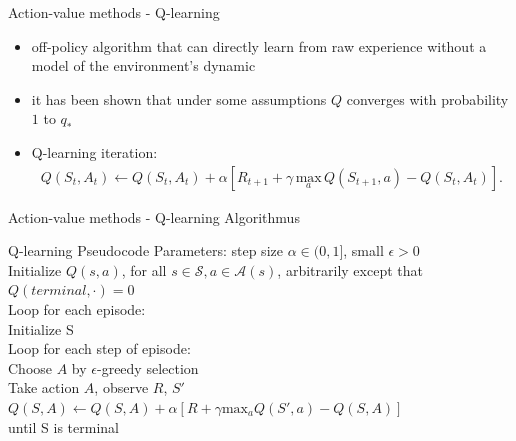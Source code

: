 \documentclass{beamer}
\begin{document}
\begin{frame}{Action-value methods - Q-learning}
\begin{itemize}
\item {off-policy algorithm that can directly learn from raw experience without a model of the environment's dynamic}
\pause
\item {it has been shown that under some assumptions $Q$ converges with probability $1$ to $q_*$}
\pause
\item {Q-learning iteration:
\begin{align*}
Q(S_t,A_t) \leftarrow Q(S_t, A_t) + \alpha [R_{t+1} + \gamma \, \underset{a}{\mathrm{max}} \, Q(S_{t+1},a) - Q(S_t,A_t)].
\end{align*}}
\end{itemize}
\end{frame}
\begin{frame}{Action-value methods - Q-learning Algorithmus}
\begin{exampleblock}{Q-learning Pseudocode}
Parameters: step size $\alpha \in (0,1]$, small $\epsilon > 0$\\
Initialize $Q(s,a)$, for all $s \in \mathcal{S}, a \in \mathcal{A}(s)$, arbitrarily except that $Q(terminal,\cdot) = 0$\\
\vspace*{0.3cm}
Loop for each episode:\\
\hspace*{0.5cm} Initialize S\\
\hspace*{0.5cm} Loop for each step of episode:\\
\hspace*{0.5cm} \hspace*{0.5cm} Choose $A$ by $\epsilon$-greedy selection\\
\hspace*{0.5cm} \hspace*{0.5cm} Take action $A$, observe $R$, $S'$\\
\hspace*{0.5cm} \hspace*{0.5cm} $Q(S,A) \leftarrow Q(S,A) + \alpha \left[ R + \gamma \mathrm{max}_a Q(S',a)-Q(S,A)\right]$\\
\hspace*{0.5cm} until S is terminal
\end{exampleblock}
\end{frame}
\end{document}
